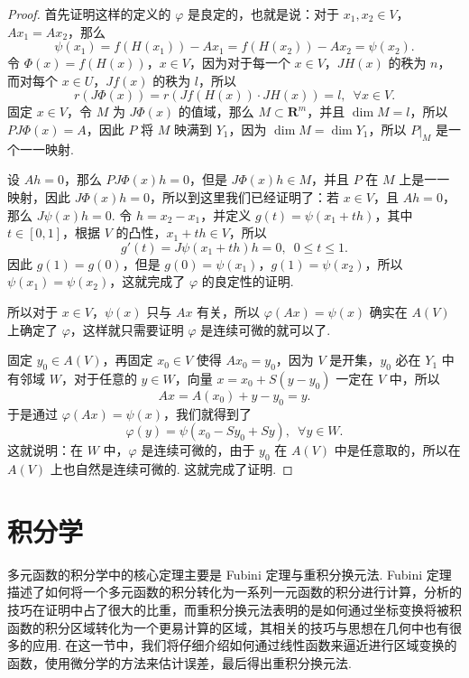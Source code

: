 \begin{proof}
    首先证明这样的定义的 $\varphi$ 是良定的，也就是说：对于 $x_1, x_2\in V$，$Ax_1 = Ax_2$，那么 \[\psi(x_1) = f(H(x_1)) - Ax_1 = f(H(x_2)) - Ax_2 = \psi(x_2).\]
    令 $\Phi(x) = f(H(x))$，$x\in V$，因为对于每一个 $x\in V$，$JH(x)$ 的秩为 $n$，而对每个 $x\in U$，$Jf(x)$ 的秩为 $l$，所以 \[r(J\Phi(x)) = r(Jf(H(x))\cdot JH(x)) = l, \enspace \forall x \in V.\]
    固定 $x\in V$，令 $M$ 为 $J\Phi(x)$ 的值域，那么 $M\subset \mathbf{R}^m$，并且 $\dim M = l$，所以 $PJ\Phi(x) = A$，因此 $P$ 将 $M$ 映满到 $Y_1$，因为 $\dim M = \dim Y_1$，所以 $\left.P\right|_{M}$ 是一个一一映射.

    设 $Ah = 0$，那么 $PJ\Phi(x)h = 0$，但是 $J\Phi(x)h \in M$，并且 $P$ 在 $M$ 上是一一映射，因此 $J\Phi(x)h = 0$，所以到这里我们已经证明了：若 $x\in V$，且 $Ah = 0$，那么 $J\psi(x)h = 0$.
    令 $h = x_2 - x_1$，并定义 $g(t) = \psi(x_1 + th)$，其中 $t\in [0, 1]$，根据 $V$ 的凸性，$x_1 + th\in V$，所以 \[g'(t) = J\psi(x_1 + th)h = 0, \enspace 0 \leqslant t\leqslant 1.\]
    因此 $g(1) = g(0)$，但是 $g(0) = \psi(x_1)$，$g(1) = \psi(x_2)$，所以 $\psi(x_1) = \psi(x_2)$，这就完成了 $\varphi$ 的良定性的证明.

    所以对于 $x\in V$，$\psi(x)$ 只与 $Ax$ 有关，所以 $\varphi(Ax) = \psi(x)$ 确实在 $A(V)$ 上确定了 $\varphi$，这样就只需要证明 $\varphi$ 是连续可微的就可以了.

    固定 $y_0\in A(V)$，再固定 $x_0\in V$ 使得 $Ax_0 = y_0$，因为 $V$ 是开集，$y_0$ 必在 $Y_1$ 中有邻域 $W$，对于任意的 $y\in W$，向量 $x = x_0 + S(y - y_0)$ 一定在 $V$ 中，所以 \[Ax = A(x_0) + y - y_0 = y.\]
    于是通过 $\varphi(Ax) = \psi(x)$，我们就得到了 \[\varphi(y) = \psi(x_0 - Sy_0 + Sy), \enspace \forall y\in W.\]
    这就说明：在 $W$ 中，$\varphi$ 是连续可微的，由于 $y_0$ 在 $A(V)$ 中是任意取的，所以在 $A(V)$ 上也自然是连续可微的. 这就完成了证明.
\end{proof}

\section{积分学}

多元函数的积分学中的核心定理主要是 Fubini 定理与重积分换元法. Fubini 定理描述了如何将一个多元函数的积分转化为一系列一元函数的积分进行计算，分析的技巧在证明中占了很大的比重，而重积分换元法表明的是如何通过坐标变换将被积函数的积分区域转化为一个更易计算的区域，其相关的技巧与思想在几何中也有很多的应用. 在这一节中，我们将仔细介绍如何通过线性函数来逼近进行区域变换的函数，使用微分学的方法来估计误差，最后得出重积分换元法.

